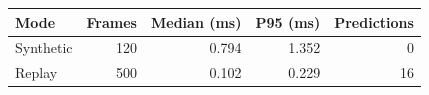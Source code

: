 \begin{tabular}{lrrrr}
\toprule
Mode & Frames & Median (ms) & P95 (ms) & Predictions \\
\midrule
Synthetic & 120 & 0.794 & 1.352 & 0 \\
Replay & 500 & 0.102 & 0.229 & 16 \\
\bottomrule
\end{tabular}

